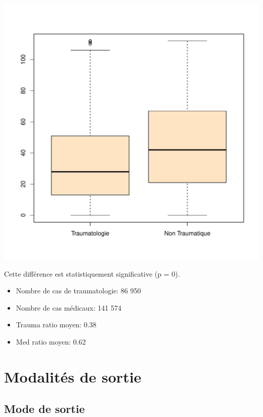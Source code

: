 \documentclass[12pt,english,french,twoside]{book}\usepackage[]{graphicx}\usepackage[]{color}
\makeatletter
\def\maxwidth{ %
  \ifdim\Gin@nat@width>\linewidth
    \linewidth
  \else
    \Gin@nat@width
  \fi
}
\makeatother
\begin{document}
\includegraphics[width=\maxwidth]{figure/trauma_age-1} 


Cette différence est statistiquement significative (p = 0).

\begin{itemize}
  \item Nombre de cas de traumatologie: 86 950
  \item Nombre de cas médicaux: 141 574
  \item Trauma ratio moyen: 0.38
  \item Med ratio moyen: 0.62
\end{itemize}



 

\newpage
\chapter{Modalités de sortie}


\section{Mode de sortie}
\end{document}
